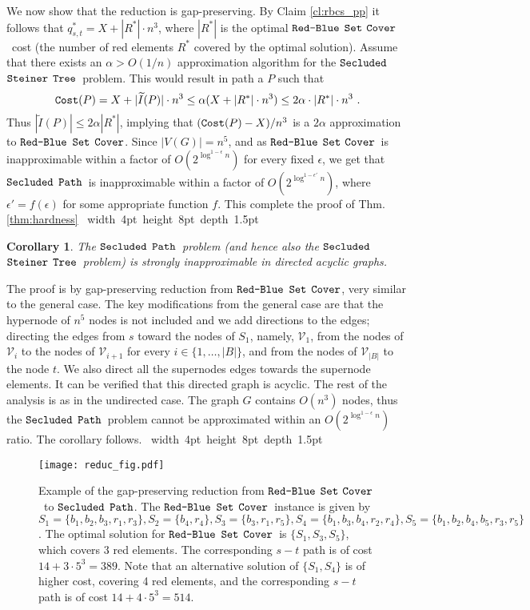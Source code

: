 \documentclass[12pt]{article}
\newtheorem{corollary}[theorem]{Corollary}
\def\Cost{\mbox{\tt Cost}}
\def\Proof{\par\noindent{\bf Proof:~}}
\def\blackslug{\hbox{\hskip 1pt \vrule width 4pt height 8pt
    depth 1.5pt \hskip 1pt}}
\def\QED{\quad\blackslug\lower 8.5pt\null\par}
\newcommand{\PS}[0]{$\mbox{\tt Secluded}$ $\mbox{\tt Steiner}$
$\mbox{\tt Tree}$}
\newcommand{\PP}[0]{$\mbox{\tt Secluded}$ $\mbox{\tt Path}$}
\newcommand{\SuperIndex}[0]{\widetilde{I}}
\newcommand{\RBSC}[0]{$\mbox{\tt Red-Blue}$ $\mbox{\tt Set}$ $\mbox{\tt Cover}$}
\def\Cost{\mbox{\tt Cost}}
\begin{document}
We now show that the reduction is gap-preserving.
By Claim \ref{cl:rbcs_pp} it follows that $q^{*}_{s,t}=X+|R^{*}| \cdot n^{3}$, where $|R^*|$ is the optimal \RBSC\ cost (the number of red elements $R^{*}$ covered by the optimal solution).
Assume that there exists an $\alpha>O(1/n)$ approximation algorithm for the \PS\ problem. This would result in path a $P$ such that
\begin{equation*}
\Cost(P)= X+|\SuperIndex(P)| \cdot n^{3}\leq \alpha(X+|R^{*}| \cdot n^{3})\leq 2\alpha \cdot |R^{*}| \cdot n^{3}~.
\end{equation*}
Thus $|\SuperIndex(P)| \leq 2\alpha |R^{*}|$, implying that
$(\Cost(P)-X)/n^{3}$ is a $2\alpha$ approximation to \RBSC. Since $|V(G)|=n^{5}$, and as \RBSC\ is inapproximable within a factor of $O(2^{\log^{1-\epsilon}n})$ for every fixed $\epsilon$, we get that \PP\ is inapproximable within a factor of $O(2^{\log^{1-\epsilon'}n})$, where $\epsilon'=f(\epsilon)$ for some appropriate function $f$.
This complete the proof of Thm. \ref{thm:hardness}
\QED
\begin{corollary}
\label{cor:dag}
The \PP\ problem (and hence also the \PS\ problem) is strongly inapproximable in directed acyclic graphs.
\end{corollary}
\Proof
The proof is by gap-preserving reduction from \RBSC, very similar to the general case. The  key modifications from the general case are that the hypernode of $n^{5}$ nodes is not included and we add directions to the edges; directing the edges from $s$ toward the nodes of $S_1$, namely, $\mathcal{V}_{1}$, from the nodes of $\mathcal{V}_{i}$ to the nodes of $\mathcal{V}_{i+1}$ for every $i \in \{1, \ldots, |B|\}$, and from the nodes of $\mathcal{V}_{|B|}$ to the node $t$. We also direct all the supernodes edges towards the supernode elements. It can be verified that this directed graph is acyclic. The rest of the analysis is as in the undirected case. The graph $G$ contains $O(n^{3})$ nodes, thus the \PP\ problem cannot be approximated within an $O(2^{\log^{1-\epsilon}n})$ ratio. The corollary follows.
\QED
\begin{figure}[h!]
\begin{center}
\texttt{[image: reduc\_fig.pdf]}
\caption{ \label{fig:hardness}
\sf
Example of the gap-preserving reduction from \RBSC\ to \PP.
The \RBSC\ instance is given by $S_1=\{b_1,b_2,b_3,r_1,r_3\}, S_2=\{b_4, r_4\}, S_3=\{b_3, r_1,r_5\}, S_4=\{b_1,b_3,b_4,r_2,r_4\}, S_5=\{b_1,b_2,b_4,b_5,r_3,r_5 \}$.  The optimal solution for \RBSC\ is $\{S_1, S_3, S_5\}$, which covers $3$ red elements. The corresponding $s-t$ path is of cost $14+3 \cdot 5^{3}=389$. Note that an alternative solution of $\{S_1, S_4\}$ is of higher cost, covering 4 red elements, and the corresponding $s-t$ path is of cost $14+4 \cdot 5^{3}=514$.
}
\end{center}
\end{figure}
\end{document}
